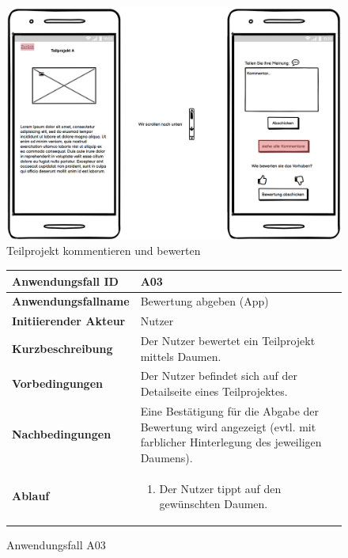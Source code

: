 \begin{figure}[h]
	\centering
	\includegraphics[width=\textwidth]{img/MUcomment.png}			
	\caption{Teilprojekt kommentieren und bewerten}
	\label{fig:anwendungsfalldiagramm-app}
\end{figure}

\begin{figure}[h]
	\centering
	\begin{tabularx}{\textwidth}{ X | X }
		\textbf{Anwendungsfall ID} & A03 \\ \hline
		\textbf{Anwendungsfallname} & Bewertung abgeben (App) \\ \hline
		\textbf{Initiierender Akteur} & Nutzer \\ \hline
		\textbf{Kurzbeschreibung} & Der Nutzer bewertet ein Teilprojekt mittels Daumen.  \\ \hline
		\textbf{Vorbedingungen} & Der Nutzer befindet sich auf der Detailseite eines Teilprojektes.  \\ \hline
		\textbf{Nachbedingungen} & Eine Bestätigung für die Abgabe der Bewertung wird angezeigt (evtl. mit farblicher Hinterlegung des jeweiligen Daumens).  \\ \hline
		\textbf{Ablauf} &
			\begin{enumerate}
				\item Der Nutzer tippt auf den gewünschten Daumen.
			\end{enumerate} \\ \hline
	\end{tabularx}
	\caption{Anwendungsfall A03}
	\label{fig:anwendungsfall-app-tabelle-xx-1}
\end{figure}


